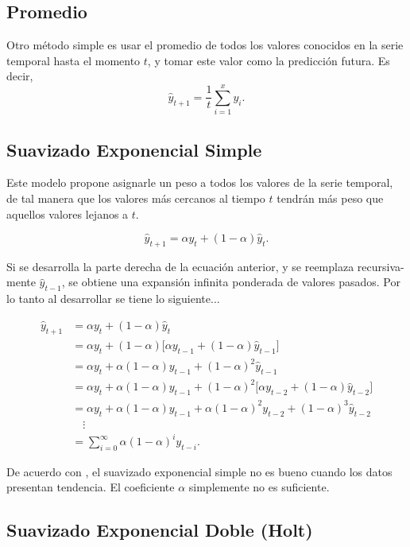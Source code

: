 \documentclass[12pt,letterpaper]{article}
\begin{document}
\subsection{Promedio}
Otro método simple es usar el promedio de todos los valores conocidos en la serie temporal hasta el momento $t$, y tomar este valor como la predicción futura. Es decir,
\begin{equation}
    \hat{y}_{t+1} = \frac{1}{t}\sum_{i=1}^x y_i.
\end{equation}

\subsection{Suavizado Exponencial Simple}
Este modelo propone asignarle un peso a todos los valores de la serie temporal, de tal manera que los valores más cercanos al tiempo $t$ tendrán más peso que aquellos valores lejanos a $t$. 

\begin{equation}
    \hat{y}_{t+1} = \alpha y_t+ (1-\alpha) \hat{y}_t.
\end{equation}

Si se desarrolla la parte derecha de la ecuación anterior, y se reemplaza recursiva-mente $\hat{y}_{t-1}$, se obtiene una expansión infinita ponderada de valores pasados. Por lo tanto al desarrollar se tiene lo siguiente...

\begin{align}
     \hat{y}_{t+1} &= \alpha y_t+ (1-\alpha) \hat{y}_t\\
     &= \alpha y_t + (1-\alpha)\big[ \alpha y_{t-1 } + (1-\alpha) \hat{y}_{t-1} \big]\\
     &= \alpha y_t + \alpha(1-\alpha) y_{t-1}+(1-\alpha)^2 \hat{y}_{t-1}\\
     &= \alpha y_t + \alpha(1-\alpha) y_{t-1}+(1-\alpha)^2\big[ \alpha y_{t-2} + (1-\alpha)\hat{y}_{t-2} \big]\\
     &= \alpha y_t + \alpha(1-\alpha) y_{t-1}+\alpha(1-\alpha)^2 y_{t-2}+(1-\alpha)^3\hat{y}_{t-2}\\
     &\quad \vdots \nonumber \\
     &= \sum_{i=0}^{\infty} \alpha(1-\alpha)^i y_{t-i}.
\end{align}

De acuerdo con \cite{nist-ses}, el suavizado exponencial simple no es bueno cuando los datos presentan tendencia. El coeficiente $\alpha$ simplemente no es suficiente.

\subsection{Suavizado Exponencial Doble (Holt)}
\end{document}
